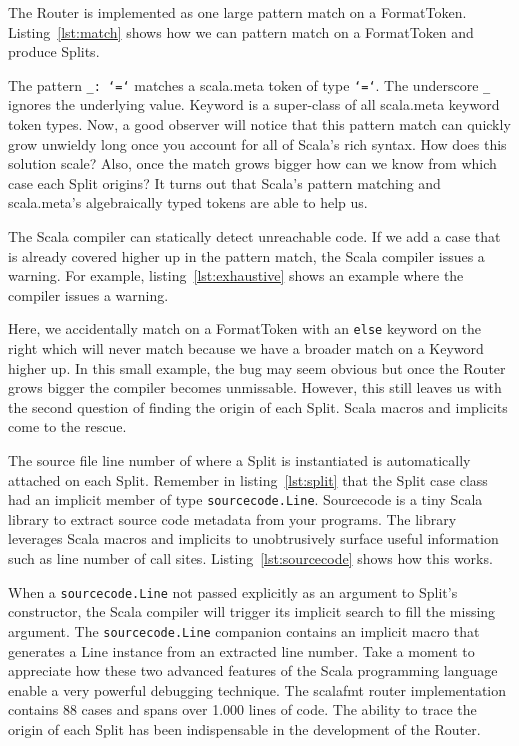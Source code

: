 The Router is implemented as one large pattern match on a FormatToken.
Listing~\ref{lst:match} shows how we can pattern match on a FormatToken and produce Splits.
\begin{minipage}{\linewidth}
  
\end{minipage}
The pattern \texttt{\_: `=`} matches a scala.meta token of type \texttt{`=`}.
The underscore \texttt{\_} ignores the underlying value.
Keyword is a super-class of all scala.meta keyword token types.
Now, a good observer will notice that this pattern match can quickly grow unwieldy long once you account for all of Scala's rich syntax.
How does this solution scale?
Also, once the match grows bigger how can we know from which case each Split origins?
It turns out that Scala's pattern matching and scala.meta's algebraically typed tokens are able to help us.

The Scala compiler can statically detect unreachable code.
If we add a case that is already covered higher up in the pattern match, the Scala compiler issues a warning.
For example, listing~\ref{lst:exhaustive} shows an example where the compiler issues a warning.
\begin{minipage}{\linewidth}
  
\end{minipage}
Here, we accidentally match on a FormatToken with an \texttt{else} keyword on the right which will never match because we have a broader match on a Keyword higher up.
In this small example, the bug may seem obvious but once the Router grows bigger the compiler becomes unmissable.
However, this still leaves us with the second question of finding the origin of each Split.
Scala macros\autocite{burmako2013scala} and implicits\autocite{oliveira2010type} come to the rescue.

The source file line number of where a Split is instantiated is automatically attached on each Split.
Remember in listing~\ref{lst:split} that the Split case class had an implicit member of type \texttt{sourcecode.Line}.
Sourcecode\autocite{lihao91:online} is a tiny Scala library to extract source code metadata from your programs.
The library leverages Scala macros and implicits to unobtrusively surface useful information such as line number of call sites.
Listing~\ref{lst:sourcecode} shows how this works.

When a \texttt{sourcecode.Line} not passed explicitly as an argument to Split's constructor, the Scala compiler will trigger its implicit search to fill the missing argument.
The \texttt{sourcecode.Line} companion contains an implicit macro that generates a Line instance from an extracted line number.
Take a moment to appreciate how these two advanced features of the Scala programming language enable a very powerful debugging technique.
The scalafmt router implementation contains 88 cases and spans over 1.000 lines of code.
The ability to trace the origin of each Split has been indispensable in the development of the Router.


